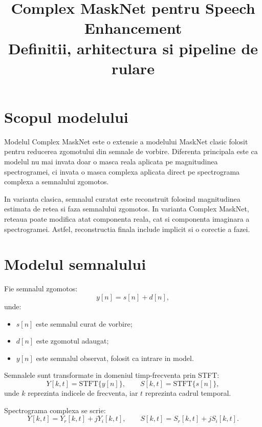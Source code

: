 \documentclass[12pt,a4paper]{article}
\title{Complex MaskNet pentru Speech Enhancement\\
\large Definitii, arhitectura si pipeline de rulare}
\author{}
\date{}
\begin{document}
\maketitle
\tableofcontents
\newpage

\section{Scopul modelului}

Modelul Complex MaskNet este o extensie a modelului MaskNet clasic folosit pentru
reducerea zgomotului din semnale de vorbire. Diferenta principala este ca modelul
nu mai invata doar o masca reala aplicata pe magnitudinea spectrogramei, ci invata
o masca complexa aplicata direct pe spectrograma complexa a semnalului zgomotos.

In varianta clasica, semnalul curatat este reconstruit folosind magnitudinea
estimata de retea si faza semnalului zgomotos. In varianta Complex MaskNet, reteaua
poate modifica atat componenta reala, cat si componenta imaginara a spectrogramei.
Astfel, reconstructia finala include implicit si o corectie a fazei.

\section{Modelul semnalului}

Fie semnalul zgomotos:
\begin{equation}
    y[n] = s[n] + d[n],
\end{equation}
unde:
\begin{itemize}
    \item $s[n]$ este semnalul curat de vorbire;
    \item $d[n]$ este zgomotul adaugat;
    \item $y[n]$ este semnalul observat, folosit ca intrare in model.
\end{itemize}

Semnalele sunt transformate in domeniul timp-frecventa prin STFT:
\begin{equation}
    Y[k,t] = \mathrm{STFT}\{y[n]\},
    \qquad
    S[k,t] = \mathrm{STFT}\{s[n]\},
\end{equation}
unde $k$ reprezinta indicele de frecventa, iar $t$ reprezinta cadrul temporal.

Spectrograma complexa se scrie:
\begin{equation}
    Y[k,t] = Y_r[k,t] + jY_i[k,t],
    \qquad
    S[k,t] = S_r[k,t] + jS_i[k,t].
\end{equation}
\end{document}
